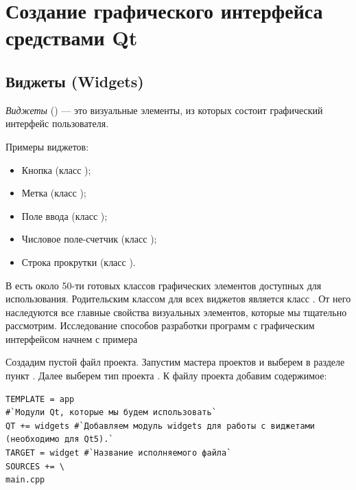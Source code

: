\chapter[Создание графического интерфейса средствами Qt]{Создание графического интерфейса средствами Qt}
\section[Виджеты (Widgets)]{Виджеты (Widgets)}\label{ch13:1}
\emph{Виджеты} () --- это визуальные элементы, из которых состоит графический интерфейс
пользователя.

Примеры виджетов:

\begin{itemize}
\item Кнопка (класс );
\item Метка (класс );
\item Поле ввода (класс );
\item Числовое поле-счетчик (класс );
\item Строка прокрутки (класс ).
\end{itemize}

В  есть около 50-ти готовых классов графических элементов доступных для использования. Родительским классом для всех
виджетов является  класс . От него наследуются все главные свойства визуальных
элементов, которые мы тщательно рассмотрим. Исследование способов разработки программ с графическим интерфейсом начнем
с примера

Создадим пустой файл проекта. Запустим мастера проектов и выберем в разделе
 пункт . Далее выберем тип проекта
. К файлу проекта добавим содержимое:
\begin{lstlisting}
TEMPLATE = app
#`Модули Qt, которые мы будем использовать`
QT += widgets #`Добавляем модуль widgets для работы с виджетами (необходимо для Qt5).`
TARGET = widget #`Название исполняемого файла`
SOURCES += \
main.cpp
\end{lstlisting}

